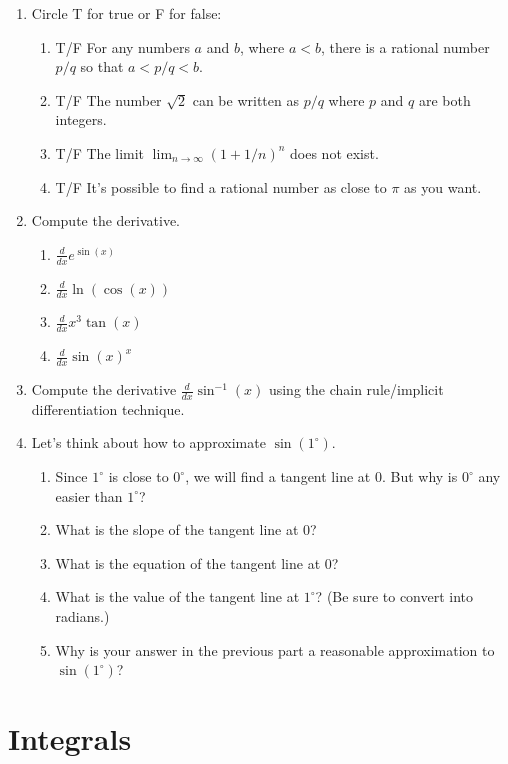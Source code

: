 \documentclass[11pt]{book}
\begin{document}
\begin{enumerate}


\item Circle T for true or F for false:
\begin{enumerate}
\item T/F For any numbers $a$ and $b$, where $a<b$, there is a rational number $p/q$ so that $a<p/q<b$.

\item T/F The number $\sqrt{2}$ can be written as $p/q$ where $p$ and $q$ are both integers.

\item T/F The limit $\lim_{n\to \infty} (1+1/n)^{n}$ does not exist.

\item T/F It's possible to find a rational number as close to $\pi$ as you want.

\end{enumerate}


\item Compute the derivative.  

\begin{enumerate}
\item
$\frac{d}{dx} e^{\sin(x)}$
\item
$\frac{d}{dx} \ln(\cos(x))$
\item
$\frac{d}{dx} x^3\tan(x)$
\item
$\frac{d}{dx} \sin(x)^x$
\end{enumerate}




\item
Compute the derivative $\frac{d}{dx} \sin^{-1}(x)$ using the chain rule/implicit differentiation technique.  



\item Let's think about how to approximate $\sin(1^\circ)$.

\begin{enumerate}


\item  Since $1^\circ$ is close to $0^\circ$, we will find a tangent line at 0.  But why is $0^\circ$ any easier than $1^\circ$?



\item What is the slope of the tangent line at $0$?



\item What is the equation of the tangent line at $0$?



\item What is the value of the tangent line at $1^\circ$?  (Be sure to convert into radians.)



\item Why is your answer in the previous part a reasonable approximation to $\sin(1^\circ)$?

\end{enumerate}


\end{enumerate}





\chapter{Integrals}  
\end{document}
